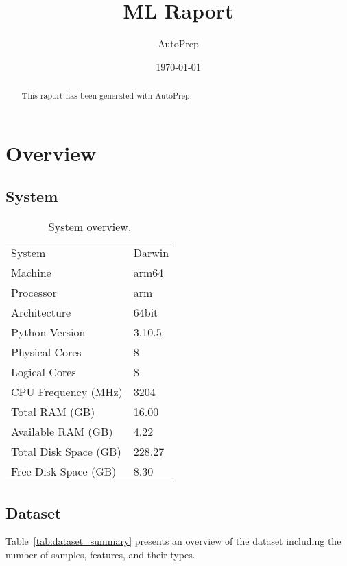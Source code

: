 \documentclass{article}%
\title{ML Raport}%
\author{AutoPrep}%
\date{\today}%
\begin{document}
%
\normalsize%
\maketitle%

    \begin{abstract}
    This raport has been generated with AutoPrep.
    \end{abstract}
\tableofcontents%
\newpage%
\section{Overview}%
\label{sec:Overview}%

%
\subsection{System}%
\label{subsec:System}%

%


\begin{table}[H]%
\begin{center}%
\renewcommand{\arraystretch}{1.5}%
\begin{tabular}{l l}%
\hline%
System&Darwin\\%
Machine&arm64\\%
Processor&arm\\%
Architecture&64bit\\%
Python Version&3.10.5\\%
Physical Cores&8\\%
Logical Cores&8\\%
CPU Frequency (MHz)&3204\\%
Total RAM (GB)&16.00\\%
Available RAM (GB)&4.22\\%
Total Disk Space (GB)&228.27\\%
Free Disk Space (GB)&8.30\\%
\hline%
\end{tabular}%
\end{center}%
\caption{System overview.}%
\end{table}

%
\subsection{Dataset}%
\label{subsec:Dataset}%

%
Table~\ref{tab:dataset_summary} %
presents an overview of the dataset including the number of samples, features, and their types.%
\end{document}
